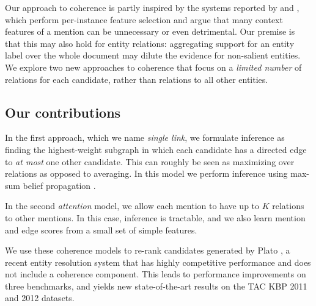 Our approach to coherence is partly inspired by the systems reported by \cite{Jin:2014} and \cite{Lazic2015}, which perform per-instance feature selection and argue that many context features of a mention can be unnecessary or even detrimental. 
Our premise is that this may also hold for entity relations: aggregating support for an entity label over the whole document may dilute the evidence for non-salient entities. We explore two new approaches to coherence that focus on a \emph{limited number} of relations for each candidate, rather than relations to all other entities. 


\subsection{Our contributions}
\label{sec:intro:our}


In the first approach, which we name \emph{single link}, we formulate inference as finding the highest-weight subgraph in which each candidate has a directed edge to \emph{at most} one other candidate. This can roughly be seen as maximizing over relations as opposed to averaging. In this model we perform inference using max-sum belief propagation \cite{Kschischang2001}.

In the second \emph{attention} model, we allow each mention to have up to $K$ relations to other mentions. In this case, inference is tractable, and we also learn mention and edge scores from a small set of simple features.   %

We use these coherence models to re-rank candidates generated by Plato \cite{Lazic2015}, a recent entity resolution system that has highly competitive performance and does not include a coherence component. This leads to performance improvements on three benchmarks, and yields new state-of-the-art results on the TAC KBP 2011 and 2012 datasets.

